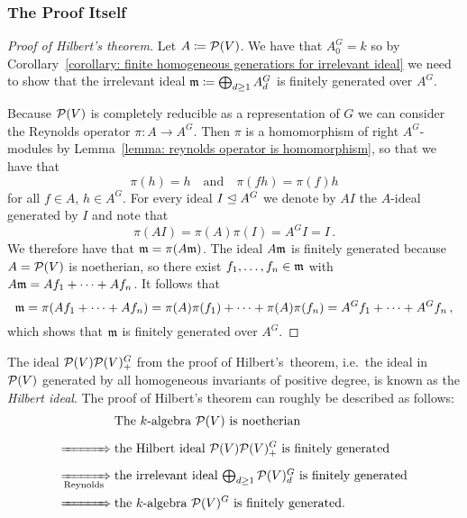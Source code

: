 \subsubsection{The Proof Itself}


\begin{proof}[Proof of Hilbert’s theorem]
  Let $A \coloneqq \mathcal{P}(V)$.
  We have that $A^G_0 = k$ so by Corollary~\ref{corollary: finite homogeneous generatiors for irrelevant ideal} we need to show that the irrelevant ideal $\mathfrak{m} \coloneqq \bigoplus_{d \geq 1} A^G_d$  is finitely generated over $A^G$.
  
  Because $\mathcal{P}(V)$ is completely reducible as a representation of $G$ we can consider the Reynolds operator $\pi \colon A \to A^G$.
  Then $\pi$ is a homomorphism of right $A^G$-modules by Lemma~\ref{lemma: reynolds operator is homomorphism}, so that we have that
  \[
      \pi(h)
    = h
    \quad\text{and}\quad
      \pi(fh)
    = \pi(f) h
  \]
  for all $f \in A$, $h \in A^G$.
  For every ideal $I \trianglelefteq A^G$ we denote by $A I$ the $A$-ideal generated by $I$ and note that
  \begin{equation}
      \pi(A I)
    = \pi(A) \pi(I)
    = A^G I
    = I \,.
  \end{equation}
  We therefore have that $\mathfrak{m} = \pi(A \mathfrak{m})$.
  The ideal $A \mathfrak{m}$ is finitely generated because $A = \mathcal{P}(V)$ is noetherian, so there exist $f_1, \dotsc, f_n \in \mathfrak{m}$ with $A \mathfrak{m} = A f_1 + \dotsb + A f_n$.
  It follows that
  \[
      \mathfrak{m}
    = \pi(A f_1 + \dotsb + A f_n)
    = \pi(A) \pi(f_1) + \dotsb + \pi(A) \pi(f_n)
    = A^G f_1 + \dotsb + A^G f_n \,,
  \]
  which shows that $\mathfrak{m}$ is finitely generated over $A^G$.
\end{proof}


\begin{remark}
  The ideal $\mathcal{P}(V) \mathcal{P}(V)^G_+$ from the proof of Hilbert’s~theorem, i.e.\ the ideal in $\mathcal{P}(V)$ generated by all homogeneous invariants of positive degree, is known as the \emph{Hilbert ideal}.
  The proof of Hilbert’s theorem can roughly be described as follows:
  \begin{align*}
    \phantom{\xRightarrow[\text{Reynolds}]{}}&\;
      \text{The $k$-algebra $\mc{P}(V)$ is noetherian}  \\
    \xRightarrow[\phantom{\text{Reynolds}}]{}&\;
      \text{the Hilbert ideal $\mc{P}(V) \mc{P}(V)^G_+$ is finitely generated}  \\
    \xRightarrow[\text{Reynolds}]{}&\;
      \text{the irrelevant ideal $\textstyle\bigoplus_{d \geq 1} \mc{P}(V)^G_d$ is finitely generated} \\
    \xRightarrow[\phantom{\text{Reynolds}}]{}&\;
      \text{the $k$-algebra $\mc{P}(V)^G$ is finitely generated}.
  \end{align*}
\end{remark}




